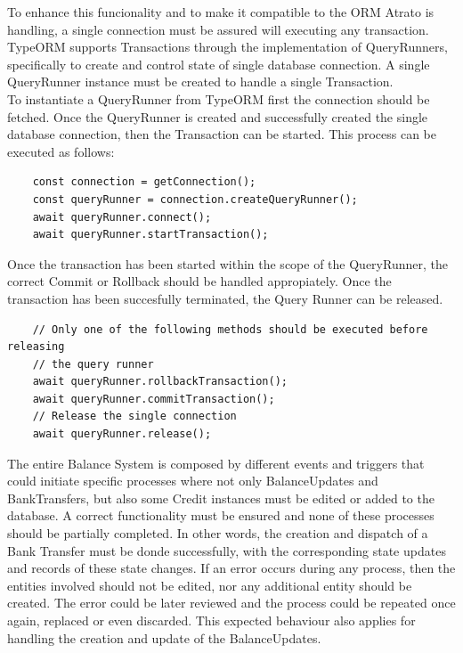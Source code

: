 To enhance this funcionality and to make it compatible to the ORM Atrato is handling, a single connection must be assured will executing any transaction. TypeORM supports Transactions through the implementation of QueryRunners, specifically to create and control state of single database connection. A single QueryRunner instance must be created to handle a single Transaction.\cite{typeorm}\\ 

To instantiate a QueryRunner from TypeORM first the connection should be fetched. Once the QueryRunner is created and successfully created the single database connection, then the Transaction can be started. This process can be executed as follows:

\begin{verbatim}
    const connection = getConnection();
    const queryRunner = connection.createQueryRunner();
    await queryRunner.connect();
    await queryRunner.startTransaction();
\end{verbatim}

Once the transaction has been started within the scope of the QueryRunner, the correct Commit or Rollback should be handled appropiately. Once the transaction has been succesfully terminated, the Query Runner can be released.\cite{typeorm}

\begin{verbatim}
    // Only one of the following methods should be executed before releasing
    // the query runner
    await queryRunner.rollbackTransaction();
    await queryRunner.commitTransaction();
    // Release the single connection
    await queryRunner.release();
\end{verbatim}

The entire Balance System is composed by different events and triggers that could initiate specific processes where not only BalanceUpdates and BankTransfers, but also some Credit instances must be edited or added to the database. A correct functionality must be ensured and none of these processes should be partially completed. In other words, the creation and dispatch of a Bank Transfer must be donde successfully, with the corresponding state updates and records of these state changes. If an error occurs during any process, then the entities involved should not be edited, nor any additional entity should be created. The error could be later reviewed and the process could be repeated once again, replaced or even discarded. This expected behaviour also applies for handling the creation and update of the BalanceUpdates.\\

